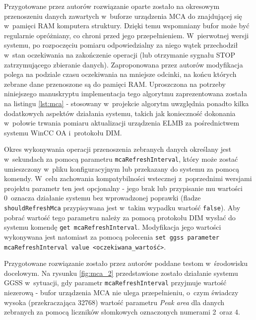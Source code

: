 Przygotowane przez autorów rozwiązanie oparte zostało na okresowym przenoszeniu danych zawartych w~buforze urządzenia MCA do znajdującej się w~pamięci RAM komputera struktury. Dzięki temu wspomniany bufor może być regularnie opróżniany, co chroni przed jego przepełnieniem. W~pierwotnej wersji systemu, po rozpoczęciu pomiaru odpowiedzialny za niego wątek przechodził w~stan oczekiwania na zakończenie operacji (lub otrzymanie sygnału STOP zatrzymującego zbieranie danych). Zaproponowana przez autorów modyfikacja polega na podziale czasu oczekiwania na mniejsze odcinki, na końcu których zebrane dane przenoszone są do pamięci RAM. Uproszczona na potrzeby niniejszego manuskryptu implementacja tego algorytmu zaprezentowana została na listingu \ref{lst:mca} - stosowany w~projekcie algorytm uwzględnia ponadto kilka dodatkowych aspektów działania systemu, takich jak konieczność dokonania w~połowie trwania pomiaru aktualizacji urządzenia ELMB za pośrednictwem systemu WinCC OA i~protokołu DIM.



Okres wykonywania operacji przenoszenia zebranych danych określany jest w~sekundach za pomocą parametru \lstinline{mcaRefreshInterval}, który może zostać umieszczony w~pliku konfiguracyjnym lub przekazany do systemu za pomocą komendy. W~celu zachowania kompatybilności wstecznej z~poprzednimi wersjami projektu parametr ten jest opcjonalny - jego brak lub przypisanie mu wartości 0~oznacza działanie systemu bez wprowadzonej poprawki (fladze \lstinline{shouldRefreshMca} przypisywana jest w~takim wypadku wartość \lstinline{false}). Aby pobrać wartość tego parametru należy za pomocą protokołu DIM wysłać do systemu komendę \lstinline{get mcaRefreshInterval}. Modyfikacja jego wartości wykonywana jest natomiast za pomocą polecenia \lstinline{set ggss parameter mcaRefreshInterval value <oczekiwana_wartość>}. 

Przygotowane rozwiązanie zostało przez autorów poddane testom w~środowisku docelowym. Na rysunku \ref{fig:mca_2} przedstawione zostało działanie systemu GGSS w~sytuacji, gdy parametr \lstinline{mcaRefreshInterval} przyjmuje wartość niezerową - bufor urządzenia MCA nie ulega przepełnieniu, o~czym świadczy wysoka (przekraczająca 32768) wartość parametru \emph{Peak area} dla danych zebranych za pomocą liczników słomkowych oznaczonych numerami 2~oraz 4.

